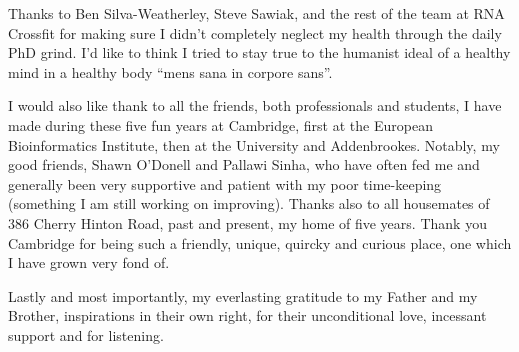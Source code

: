 \begin{acknowledgements}
 Thanks to Ben Silva-Weatherley, Steve Sawiak, and the rest of the team at RNA Crossfit for making sure I didn't completely neglect my health through the daily PhD grind.
 I'd like to think I tried to stay true to the humanist ideal of a healthy mind in a healthy body ``mens sana in corpore sans''.

 I would also like thank to all the friends, both professionals and students, I have made during these five fun years at Cambridge, first at the European Bioinformatics Institute, then at the University and Addenbrookes.
 Notably, my good friends, Shawn O'Donell and Pallawi Sinha, who have often fed me and generally been very supportive and patient with my poor time-keeping (something I am still working on improving).
 Thanks also to all housemates of 386 Cherry Hinton Road, past and present, my home of five years.
 Thank you Cambridge for being such a friendly, unique, quircky and curious place, one which I have grown very fond of.

 Lastly and most importantly, my everlasting gratitude to my Father and my Brother, inspirations in their own right, for their unconditional love, incessant support and for listening.

\end{acknowledgements}
